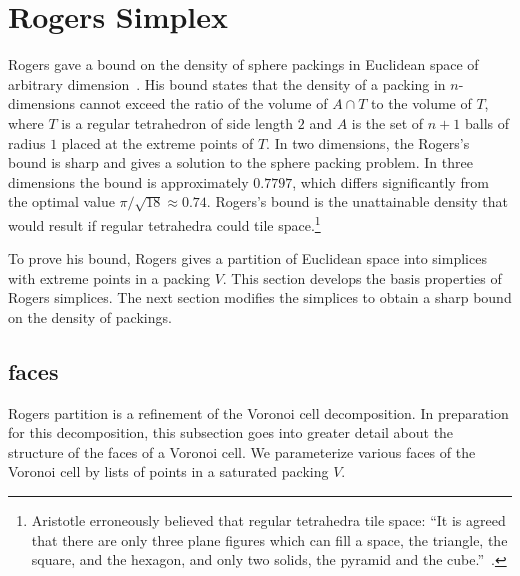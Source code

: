 \section{Rogers Simplex}\label{sec:rogers}




Rogers gave a bound on the density of sphere packings in Euclidean
space of arbitrary dimension~\cite{Rogers:1958:Packing}.  His bound
states that the density of a packing in $n$-dimensions cannot exceed
the ratio of the volume of $A \cap T$ to the volume of $T$, where $T$
is a regular tetrahedron of side length $2$ and $A$ is the set of
$n+1$ balls of radius $1$ placed at the extreme points of $T$.  In two
dimensions, the Rogers's bound is sharp and gives a solution to the
sphere packing problem.  In three dimensions the bound is
approximately $0.7797$, which differs significantly from the optimal
value $\pi/\sqrt{18}\approx 0.74$.  Rogers's bound is the unattainable density that
would result if regular tetrahedra could tile
space.\footnote{Aristotle erroneously  believed that regular tetrahedra
  tile space: ``It is agreed that there are only three plane figures
  which can fill a space, the triangle, the square, and the hexagon,
  and only two solids, the pyramid and the cube.''~\cite{Aristotle}.}

To prove his bound, Rogers gives a partition of Euclidean space into
simplices with extreme points in a packing $V$.  This section develops
the basis properties of Rogers simplices.  The next section modifies
the simplices to obtain a sharp bound on the density of packings.




\subsection{faces}

Rogers partition is a refinement of the Voronoi cell decomposition.
In preparation for this decomposition, this subsection goes into
greater detail about the structure of the faces of a Voronoi cell.  We
parameterize various faces of the Voronoi cell by lists of points in a
saturated packing $V$.

